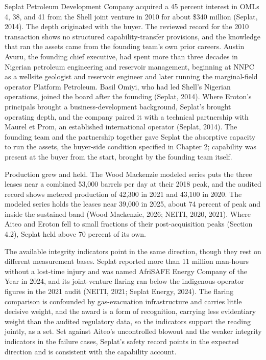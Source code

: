 Seplat Petroleum Development Company acquired a 45 percent interest in
OMLs 4, 38, and 41 from the Shell joint venture in 2010 for about \$340
million (Seplat, 2014). The depth originated with the buyer. The
reviewed record for the 2010 transaction shows no structured
capability-transfer provisions, and the knowledge that ran the assets
came from the founding team's own prior careers. Austin Avuru, the
founding chief executive, had spent more than three decades in Nigerian
petroleum engineering and reservoir management, beginning at NNPC as a
wellsite geologist and reservoir engineer and later running the
marginal-field operator Platform Petroleum. Basil Omiyi, who had led
Shell's Nigerian operations, joined the board after the founding
(Seplat, 2014). Where Eroton's principals brought a business-development
background, Seplat's brought operating depth, and the company paired it
with a technical partnership with Maurel et Prom, an established
international operator (Seplat, 2014). The founding team and the
partnership together gave Seplat the absorptive capacity to run the
assets, the buyer-side condition specified in Chapter 2; capability was
present at the buyer from the start, brought by the founding team
itself.

Production grew and held. The Wood Mackenzie modeled series puts the
three leases near a combined 53,000 barrels per day at their 2018 peak,
and the audited record shows metered production of 42,300 in 2021 and
43,100 in 2020. The modeled series holds the leases near 39,000 in 2025,
about 74 percent of peak and inside the sustained band (Wood Mackenzie,
2026; NEITI, 2020, 2021). Where Aiteo and Eroton fell to small fractions
of their post-acquisition peaks (Section 4.2), Seplat held above 70
percent of its own.

The available integrity indicators point in the same direction, though
they rest on different measurement bases. Seplat reported more than 11
million man-hours without a lost-time injury and was named AfriSAFE
Energy Company of the Year in 2024, and its joint-venture flaring ran
below the indigenous-operator figures in the 2021 audit (NEITI, 2021;
Seplat Energy, 2024). The flaring comparison is confounded by
gas-evacuation infrastructure and carries little decisive weight, and
the award is a form of recognition, carrying less evidentiary weight
than the audited regulatory data, so the indicators support the reading
jointly, as a set. Set against Aiteo's uncontrolled blowout and the
weaker integrity indicators in the failure cases, Seplat's safety record
points in the expected direction and is consistent with the capability
account.

